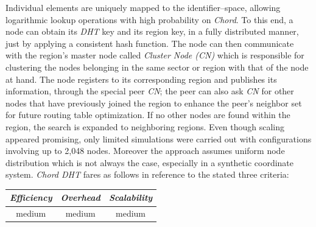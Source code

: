 Individual elements are uniquely mapped to the identifier--space,
allowing logarithmic lookup operations with high 
probability on \emph{Chord}. 
To this end, 
a node can obtain its \emph{DHT} key and its region key, 
in a fully distributed manner, just by applying a consistent hash function. 
The node can then communicate with the region's
master node called \emph{Cluster Node (CN)} which 
is responsible for clustering 
the nodes belonging in the same sector or 
region with that of the node at hand. 
The node registers to its corresponding region  and publishes
its information, through the special peer \emph{CN};
the peer can also ask \emph{CN} for other
nodes that have previously joined the region to enhance 
the peer's neighbor set for future routing table optimization.
%
If no other nodes are found within the region, 
the search is expanded to neighboring regions.
%
%
%
Even though scaling appeared promising, only limited 
simulations were carried out with configurations involving up to 2,048 nodes.
Moreover the approach assumes uniform node distribution which
is not always the case, especially in a synthetic coordinate system.
\emph{Chord DHT} fares as follows in reference to the stated three criteria:
\begin{center}
{\footnotesize
\begin{tabular}{ccc}
\emph{Efficiency} & \emph{Overhead} & \emph{Scalability} \\
\hline
%
medium &
%
medium &
%
medium
\end{tabular}
}
\end{center}



